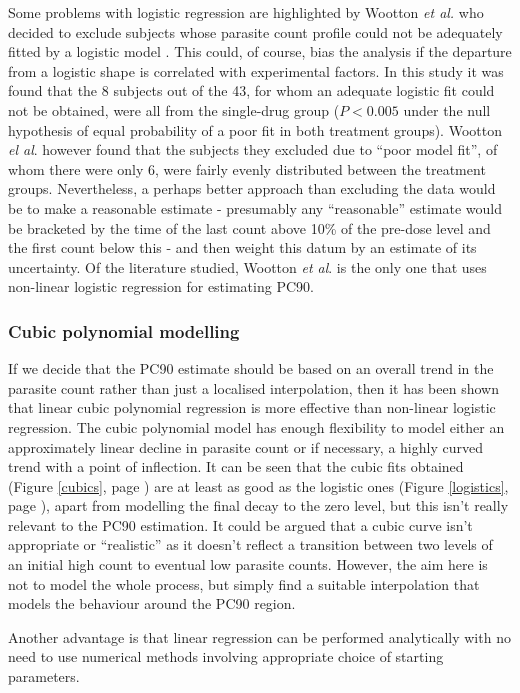 Some problems with logistic regression are highlighted by Wootton {\it et al.}  who decided to exclude subjects whose parasite count profile could not be adequately fitted by a logistic model \cite{wootton}. This could, of course, bias the analysis if the departure from a logistic shape is correlated with experimental factors. In this study it was found that the 8 subjects out of the 43, for whom an adequate logistic fit could not be obtained, were all from the single-drug group ($P<0.005$ under the null hypothesis of equal probability  of a poor fit in both treatment groups). Wootton {\it el al}. however found that the subjects they excluded due to ``poor model fit'', of whom there were only 6, were fairly evenly distributed between the treatment groups. Nevertheless, a perhaps better approach than excluding the data would be to make a reasonable estimate - presumably any ``reasonable'' estimate would be bracketed by the time of the last count above 10\% of the pre-dose level and the first count below this - and then weight this datum by an estimate of its uncertainty. Of the literature studied, Wootton {\it et al}. is the only one that uses non-linear logistic regression for estimating PC90.

\subsubsection*{Cubic polynomial modelling}
If we decide that the PC90 estimate should be based on an overall trend in the parasite count rather than just a localised interpolation, then it has been shown that linear cubic polynomial regression is more effective than non-linear logistic regression. The cubic polynomial model has enough flexibility to model either an approximately linear decline in parasite count or if necessary, a highly curved trend with a point of inflection. It can be seen that the cubic fits obtained (Figure \ref{cubics}, page \pageref{cubics}) are at least as good as the logistic ones (Figure \ref{logistics}, page \pageref{logistics}), apart from modelling the final decay to the zero level, but this isn't really relevant to the PC90 estimation. It could be argued that a cubic curve isn't appropriate or ``realistic'' as it doesn't reflect a transition between two levels of an initial high count to eventual low parasite counts. However, the aim here is not to model the whole process, but simply find a suitable interpolation that models the behaviour around the PC90 region. 

Another advantage is that linear regression can be performed analytically with no need to use numerical methods involving appropriate choice of starting parameters.

